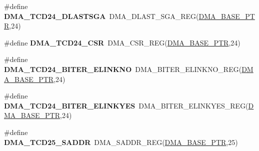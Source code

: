 \begin{DoxyCompactItemize}
\item 
\hypertarget{group___d_m_a___register___accessor___macros_ga47831d7ca9082ae1d150010e66726ea1}{}\#define {\bfseries D\+M\+A\+\_\+\+T\+C\+D24\+\_\+\+D\+L\+A\+S\+T\+S\+G\+A}~D\+M\+A\+\_\+\+D\+L\+A\+S\+T\+\_\+\+S\+G\+A\+\_\+\+R\+E\+G(\hyperlink{group___d_m_a___peripheral_ga6997fbc1b1973e9f27170217a3bd6f22}{D\+M\+A\+\_\+\+B\+A\+S\+E\+\_\+\+P\+T\+R},24)\label{group___d_m_a___register___accessor___macros_ga47831d7ca9082ae1d150010e66726ea1}

\item 
\hypertarget{group___d_m_a___register___accessor___macros_ga6ded064b631410891e9f2e2c04715b49}{}\#define {\bfseries D\+M\+A\+\_\+\+T\+C\+D24\+\_\+\+C\+S\+R}~D\+M\+A\+\_\+\+C\+S\+R\+\_\+\+R\+E\+G(\hyperlink{group___d_m_a___peripheral_ga6997fbc1b1973e9f27170217a3bd6f22}{D\+M\+A\+\_\+\+B\+A\+S\+E\+\_\+\+P\+T\+R},24)\label{group___d_m_a___register___accessor___macros_ga6ded064b631410891e9f2e2c04715b49}

\item 
\hypertarget{group___d_m_a___register___accessor___macros_ga80b71de4d63d08eafde224136493d494}{}\#define {\bfseries D\+M\+A\+\_\+\+T\+C\+D24\+\_\+\+B\+I\+T\+E\+R\+\_\+\+E\+L\+I\+N\+K\+N\+O}~D\+M\+A\+\_\+\+B\+I\+T\+E\+R\+\_\+\+E\+L\+I\+N\+K\+N\+O\+\_\+\+R\+E\+G(\hyperlink{group___d_m_a___peripheral_ga6997fbc1b1973e9f27170217a3bd6f22}{D\+M\+A\+\_\+\+B\+A\+S\+E\+\_\+\+P\+T\+R},24)\label{group___d_m_a___register___accessor___macros_ga80b71de4d63d08eafde224136493d494}

\item 
\hypertarget{group___d_m_a___register___accessor___macros_ga353829cec3e7474da1f56690b11b1d8e}{}\#define {\bfseries D\+M\+A\+\_\+\+T\+C\+D24\+\_\+\+B\+I\+T\+E\+R\+\_\+\+E\+L\+I\+N\+K\+Y\+E\+S}~D\+M\+A\+\_\+\+B\+I\+T\+E\+R\+\_\+\+E\+L\+I\+N\+K\+Y\+E\+S\+\_\+\+R\+E\+G(\hyperlink{group___d_m_a___peripheral_ga6997fbc1b1973e9f27170217a3bd6f22}{D\+M\+A\+\_\+\+B\+A\+S\+E\+\_\+\+P\+T\+R},24)\label{group___d_m_a___register___accessor___macros_ga353829cec3e7474da1f56690b11b1d8e}

\item 
\hypertarget{group___d_m_a___register___accessor___macros_gaaae720a45022e592ce70af1236b14fa2}{}\#define {\bfseries D\+M\+A\+\_\+\+T\+C\+D25\+\_\+\+S\+A\+D\+D\+R}~D\+M\+A\+\_\+\+S\+A\+D\+D\+R\+\_\+\+R\+E\+G(\hyperlink{group___d_m_a___peripheral_ga6997fbc1b1973e9f27170217a3bd6f22}{D\+M\+A\+\_\+\+B\+A\+S\+E\+\_\+\+P\+T\+R},25)\label{group___d_m_a___register___accessor___macros_gaaae720a45022e592ce70af1236b14fa2}


\end{DoxyCompactItemize}
